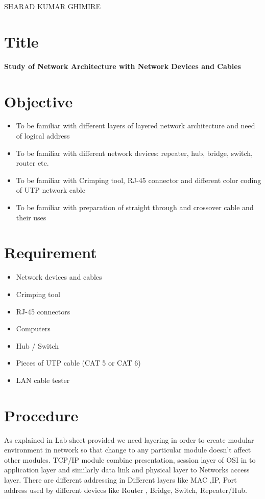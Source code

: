 \documentclass[a4paper,12pt]{article}
\begin{document}
    {SHARAD KUMAR GHIMIRE}


\tableofcontents
\pagebreak
\listoffigures
\pagebreak
\listoftables
\pagebreak
{}

\section{Title} \textbf{Study of Network Architecture with Network Devices and Cables}

\section{Objective}
\begin{itemize}
    \item To be familiar with different layers of layered network architecture and need of logical address
    \item To be familiar with different network devices: repeater, hub, bridge, switch, router etc.
    \item To be familiar with Crimping tool, RJ-45 connector and different color coding of UTP network cable
    \item To be familiar with preparation of straight through and crossover cable and their uses
\end{itemize}

\section{Requirement}
\begin{itemize}
    \item Network devices and cables
    \item Crimping tool
    \item RJ-45 connectors
    \item Computers
    \item Hub / Switch
    \item Pieces of UTP cable (CAT 5 or CAT 6)
    \item LAN cable tester

\end{itemize}


\pagebreak


\section {Procedure}
As explained in Lab sheet provided we need layering in order to create modular environment in network so that change 
to any particular module doesn't affect other modules. TCP/IP module combine presentation, 
session layer of OSI in to application layer and similarly data link and physical layer to Networks access layer.
There are different addressing in Different layers like MAC ,IP, Port address used by different devices  like Router 
, Bridge, Switch, Repeater/Hub.\\
\end{document}
